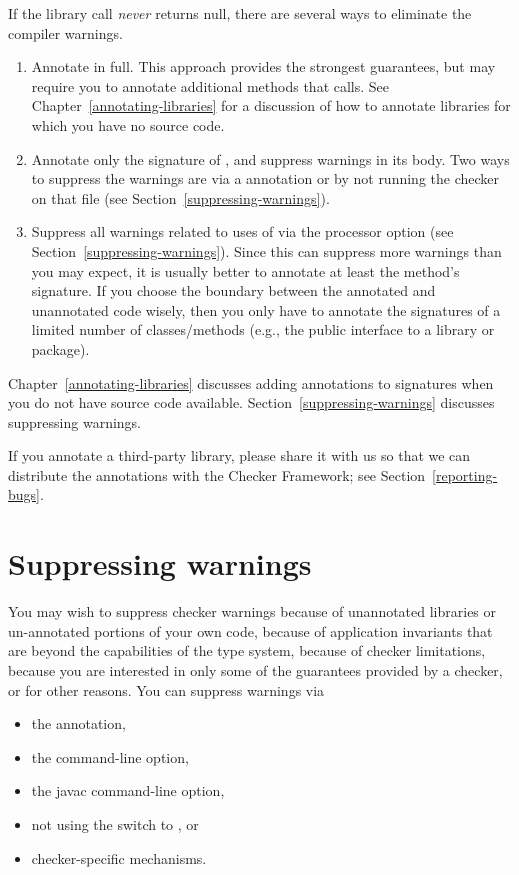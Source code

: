 If the library call \emph{never} returns null,
there are several ways to eliminate the compiler warnings.
\begin{enumerate}
\item Annotate  in full.  This approach provides
  the strongest guarantees, but may require you to annotate additional
  methods that  calls.  See
  Chapter~\ref{annotating-libraries} for a discussion of how to annotate
  libraries for which you have no source code.
\item Annotate only the signature of , and
  suppress warnings in its body.  Two ways to suppress the warnings are via a
   annotation or by not running the checker on that
  file (see Section~\ref{suppressing-warnings}).
\item Suppress all warnings related to uses of 
  via the  processor option
  (see Section~\ref{suppressing-warnings}).
  Since this can suppress more warnings than you may expect,
  it is usually better to annotate at least the method's signature.  If you
  choose the boundary between the annotated and unannotated code wisely,
  then you only have to annotate the signatures of a limited number of
  classes/methods
  (e.g., the public interface to a library or package).

\end{enumerate}

Chapter~\ref{annotating-libraries} discusses adding annotations to
signatures when you do not have source code available.
Section~\ref{suppressing-warnings} discusses suppressing warnings.


If you annotate a third-party library, please share it with us so that we
can distribute the annotations with the Checker Framework; see
Section~\ref{reporting-bugs}.


\section{Suppressing warnings\label{suppressing-warnings}}

You may wish to suppress checker warnings because of unannotated libraries
or un-annotated portions of your own code, because of application
invariants that are beyond the capabilities of the type system, because of
checker limitations, because you are interested in only some of the
guarantees provided by a checker, or for other reasons.  You can suppress
warnings via
\begin{itemize}
\item
  the  annotation,
\item
  the  command-line option,
\item
  the javac  command-line option,
\item
  not using the  switch to , or
\item
  checker-specific mechanisms.
\end{itemize}

